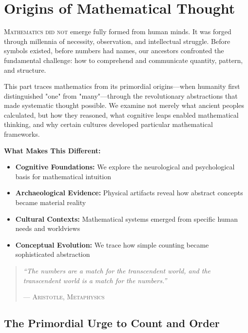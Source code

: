 \part{Origins of Mathematical Thought}
\label{part:origins}

\begin{partintro}
\lettrine[lines=3]{M}{athematics did not} emerge fully formed from human minds. It was forged through millennia of necessity, observation, and intellectual struggle. Before symbols existed, before numbers had names, our ancestors confronted the fundamental challenge: how to comprehend and communicate quantity, pattern, and structure.

This part traces mathematics from its primordial origins—when humanity first distinguished "one" from "many"—through the revolutionary abstractions that made systematic thought possible. We examine not merely what ancient peoples calculated, but how they reasoned, what cognitive leaps enabled mathematical thinking, and why certain cultures developed particular mathematical frameworks.

\vspace{1em}
\textbf{What Makes This Different:}
\begin{itemize}[noitemsep]
    \item \textbf{Cognitive Foundations:} We explore the neurological and psychological basis for mathematical intuition
    \item \textbf{Archaeological Evidence:} Physical artifacts reveal how abstract concepts became material reality
    \item \textbf{Cultural Contexts:} Mathematical systems emerged from specific human needs and worldviews
    \item \textbf{Conceptual Evolution:} We trace how simple counting became sophisticated abstraction
\end{itemize}

\begin{quote}
\textit{``The numbers are a match for the transcendent world, and the transcendent world is a match for the numbers.''}

\hfill--- \textsc{Aristotle, Metaphysics}
\end{quote}
\end{partintro}

\chapter{The Primordial Urge to Count and Order  }
